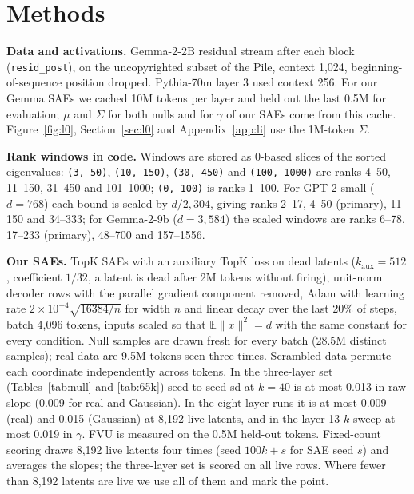 \documentclass[10pt,twocolumn]{article}
\newcommand{\Sig}{\Sigma}
\begin{document}
\section{Methods}
\label{app:methods}

\textbf{Data and activations.} Gemma-2-2B residual stream after each block (\texttt{resid\_post}), on the uncopyrighted subset of the Pile, context 1,024, beginning-of-sequence position dropped. Pythia-70m layer 3 used context 256. For our Gemma SAEs we cached 10M tokens per layer and held out the last 0.5M for evaluation; $\mu$ and $\Sig$ for both nulls and for $\gamma$ of our SAEs come from this cache. Figure~\ref{fig:l0}, Section~\ref{sec:l0} and Appendix~\ref{app:li} use the 1M-token $\Sig$.

\textbf{Rank windows in code.} Windows are stored as 0-based slices of the sorted eigenvalues: \texttt{(3, 50)}, \texttt{(10, 150)}, \texttt{(30, 450)} and \texttt{(100, 1000)} are ranks 4--50, 11--150, 31--450 and 101--1000; \texttt{(0, 100)} is ranks 1--100. For GPT-2 small ($d=768$) each bound is scaled by $d/2{,}304$, giving ranks 2--17, 4--50 (primary), 11--150 and 34--333; for Gemma-2-9b ($d=3{,}584$) the scaled windows are ranks 6--78, 17--233 (primary), 48--700 and 157--1556.

\textbf{Our SAEs.} TopK SAEs with an auxiliary TopK loss on dead latents ($k_{\mathrm{aux}}=512$, coefficient $1/32$, a latent is dead after 2M tokens without firing), unit-norm decoder rows with the parallel gradient component removed, Adam with learning rate $2\times10^{-4}\sqrt{16384/n}$ for width $n$ and linear decay over the last 20\% of steps, batch 4,096 tokens, inputs scaled so that $\mathbb{E}\|x\|^2=d$ with the same constant for every condition. Null samples are drawn fresh for every batch (28.5M distinct samples); real data are 9.5M tokens seen three times. Scrambled data permute each coordinate independently across tokens. In the three-layer set (Tables~\ref{tab:null} and \ref{tab:65k}) seed-to-seed sd at $k=40$ is at most 0.013 in raw slope (0.009 for real and Gaussian). In the eight-layer runs it is at most 0.009 (real) and 0.015 (Gaussian) at 8,192 live latents, and in the layer-13 $k$ sweep at most 0.019 in $\gamma$. FVU is measured on the 0.5M held-out tokens. Fixed-count scoring draws 8,192 live latents four times (seed $100k+s$ for SAE seed $s$) and averages the slopes; the three-layer set is scored on all live rows. Where fewer than 8,192 latents are live we use all of them and mark the point.
\end{document}
